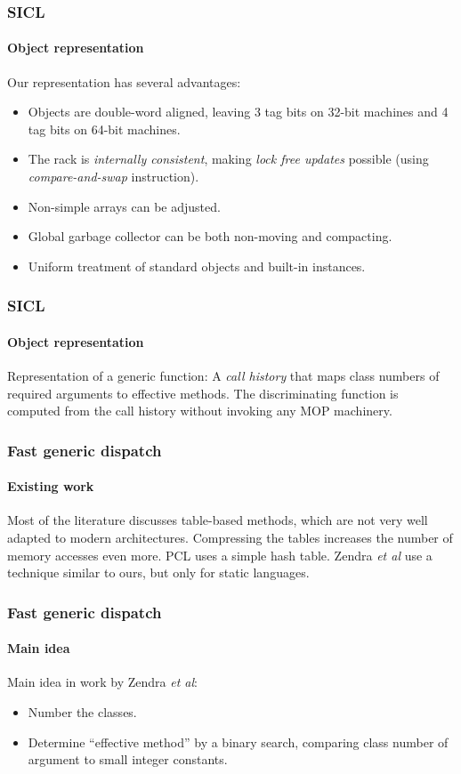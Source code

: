 \documentclass[12pt]{beamer}
\begin{document}
\begin{frame}
  \frametitle{SICL}
  \framesubtitle{Object representation}

  Our representation has several advantages:

  \begin{itemize}
  \item Objects are double-word aligned, leaving 3 tag bits on 32-bit
    machines and 4 tag bits on 64-bit machines.  
  \item The rack is \emph{internally consistent}, making \emph{lock
    free updates} possible (using \emph{compare-and-swap}
    instruction).
  \item Non-simple arrays can be adjusted. 
  \item Global garbage collector can be both non-moving and
    compacting.
  \item Uniform treatment of standard objects and built-in instances. 
  \end{itemize}

\end{frame}
\begin{frame}
  \frametitle{SICL}
  \framesubtitle{Object representation}

  Representation of a generic function:
  \vskip 0.25cm
  A \emph{call history} that maps class numbers of required arguments
  to effective methods. 
  \vskip 0.25cm
  The discriminating function is computed from the call history
  without invoking any MOP machinery. 

\end{frame}
\begin{frame}
  \frametitle{Fast generic dispatch}
  \framesubtitle{Existing work}

  Most of the literature discusses table-based methods, which are not
  very well adapted to modern architectures.  Compressing the tables
  increases the number of memory accesses even more.
  \vskip 0.5cm
  PCL uses a simple hash table.
  \vskip 0.5cm
  Zendra \emph{et al} use a technique similar to ours, but only for
  static languages.

\end{frame}
\begin{frame}
  \frametitle{Fast generic dispatch}
  \framesubtitle{Main idea}

  Main idea in work by Zendra \emph{et al}:

  \begin{itemize}
  \item Number the classes.
  \item Determine ``effective method'' by a binary search, comparing
    class number of argument to small integer constants.
  \end{itemize}

\end{frame}
\end{document}
